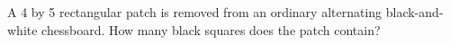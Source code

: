 A 4 by 5 rectangular patch is removed from an ordinary alternating black-and-white chessboard. How many black squares does the patch contain?
